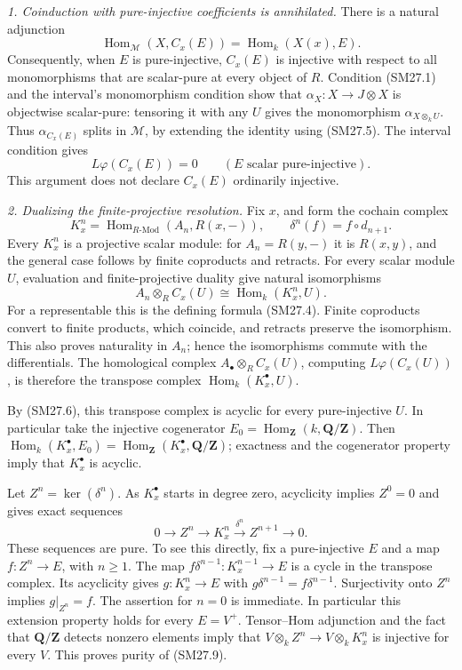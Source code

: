 \emph{1. Coinduction with pure-injective coefficients is annihilated.}
There is a natural adjunction
\[
 \operatorname{Hom}_{\mathcal M}(X,C_x(E))
   =\operatorname{Hom}_k(X(x),E).
 \tag{SM27.5}
\]
Consequently, when \(E\) is pure-injective, \(C_x(E)\) is injective
with respect to all monomorphisms that are scalar-pure at every
object of \(R\).  Condition (SM27.1) and the interval's monomorphism
condition show that \(\alpha_X:X\to J\otimes X\) is objectwise
scalar-pure: tensoring it with any \(U\) gives the monomorphism
\(\alpha_{X\otimes_k U}\).  Thus \(\alpha_{C_x(E)}\) splits in
\(\mathcal M\), by extending the identity using (SM27.5).
The interval condition gives
\[
 L\varphi(C_x(E))=0\qquad(E\text{ scalar pure-injective}).
 \tag{SM27.6}
\]
This argument does not declare \(C_x(E)\) ordinarily injective.

\emph{2. Dualizing the finite-projective resolution.}
Fix \(x\), and form the cochain complex
\[
 K_x^n=\operatorname{Hom}_{R\text{-}\mathrm{Mod}}
                (A_n,R(x,-)),\qquad
 \delta^n(f)=f\circ d_{n+1}.
 \tag{SM27.7}
\]
Every \(K_x^n\) is a projective scalar module: for
\(A_n=R(y,-)\) it is \(R(x,y)\), and the general case follows by
finite coproducts and retracts.  For every scalar module \(U\),
evaluation and finite-projective duality give natural isomorphisms
\[
 A_n\otimes_R C_x(U)
   \cong\operatorname{Hom}_k(K_x^n,U).
 \tag{SM27.8}
\]
For a representable this is the defining formula (SM27.4).
Finite coproducts convert to finite products, which coincide, and
retracts preserve the isomorphism.  This also proves naturality in
\(A_n\); hence the isomorphisms commute with the differentials.
The homological complex \(A_\bullet\otimes_R C_x(U)\), computing
\(L\varphi(C_x(U))\), is therefore the transpose complex
\(\operatorname{Hom}_k(K_x^\bullet,U)\).

By (SM27.6), this transpose complex is acyclic for every pure-injective
\(U\).  In particular take the injective cogenerator
\(E_0=\operatorname{Hom}_{\mathbf Z}(k,\mathbf Q/\mathbf Z)\).
Then
\(\operatorname{Hom}_k(K_x^\bullet,E_0)
 =\operatorname{Hom}_{\mathbf Z}(K_x^\bullet,\mathbf Q/\mathbf Z)\);
exactness and the cogenerator property imply that \(K_x^\bullet\)
is acyclic.

Let \(Z^n=\ker(\delta^n)\).  As \(K_x^\bullet\) starts in degree zero,
acyclicity implies \(Z^0=0\) and gives exact sequences
\[
 0\longrightarrow Z^n\longrightarrow K_x^n
   \xrightarrow{\delta^n}Z^{n+1}\longrightarrow0.
 \tag{SM27.9}
\]
These sequences are pure.  To see this directly, fix a pure-injective
\(E\) and a map \(f:Z^n\to E\), with \(n\ge1\).
The map \(f\delta^{n-1}:K_x^{n-1}\to E\) is a cycle in the
transpose complex.  Its acyclicity gives \(g:K_x^n\to E\) with
\(g\delta^{n-1}=f\delta^{n-1}\).  Surjectivity onto \(Z^n\)
implies \(g|_{Z^n}=f\).  The assertion for \(n=0\) is immediate.
In particular this extension property holds for every \(E=V^+\).
Tensor--Hom adjunction and the fact that
\(\mathbf Q/\mathbf Z\) detects nonzero elements imply that
\(V\otimes_k Z^n\to V\otimes_k K_x^n\) is injective for every
\(V\).  This proves purity of (SM27.9).

